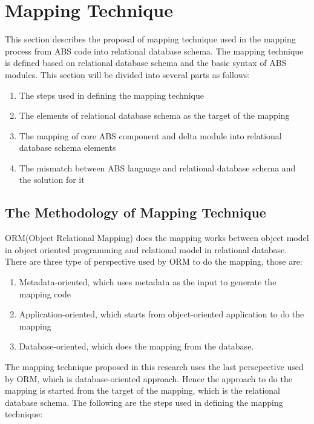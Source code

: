 \documentclass[runningheads,a4paper]{llncs}
\begin{document}
\section{Mapping Technique}
This section describes the proposal of mapping technique used in the mapping process from ABS code into relational database schema. The mapping technique is defined based on relational database schema and the basic syntax of ABS modules. This section will be divided into several parts as follows:
\begin{enumerate}
	\item The steps used in defining the mapping technique
	\item The elements of relational database schema as the target of the mapping
	\item The mapping of core ABS component and delta module into relational database schema elements
	\item The mismatch between ABS language and relational database schema and the solution for it
\end{enumerate}

\subsection{The Methodology of Mapping Technique}
ORM(Object Relational Mapping) does the mapping works between object model in object oriented programming and relational model in relational database. There are three type of perspective used by ORM to do the mapping, those are:
\begin{enumerate}
	\item Metadata-oriented, which uses metadata as the input to generate the mapping code
	\item Application-oriented, which starts from object-oriented application to do the mapping
	\item Database-oriented, which does the mapping from the database.
\end{enumerate}

The mapping technique proposed in this research uses the last perscpective used by ORM, which is database-oriented approach. Hence the approach to do the mapping is started from the target of the mapping, which is the relational database schema. The following are the steps used in defining the mapping technique:
\end{document}
